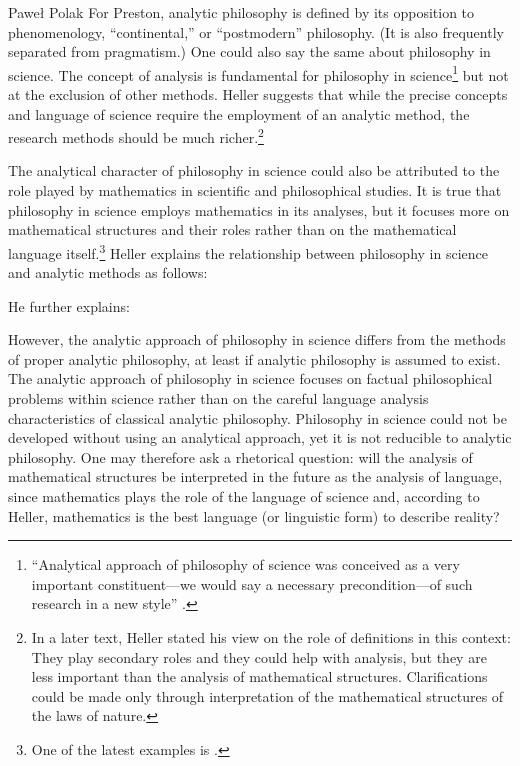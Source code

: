 \begin{artengenv}{Paweł Polak}
For Preston, analytic philosophy is defined by its opposition to phenomenology, ``continental,'' or ``postmodern''
philosophy. (It is also frequently separated from pragmatism.) One could also say the same about philosophy in science.
The concept of analysis is fundamental for philosophy in science\footnote{``Analytical approach of philosophy of science
was conceived as a very important constituent—we would say a necessary precondition—of such research in a new style''
\parencite[p.8]{pol_heller_introduction_1983}.
} but not at the exclusion of other methods. Heller suggests that while the
precise concepts and language of science require the employment of an analytic method, the research methods should be
much richer.\footnote{In a later text, Heller stated his view on the role of definitions in this context: They play
secondary roles and they could help with analysis, but they are less important than the analysis of mathematical
structures. Clarifications could be made only through interpretation of the mathematical structures of the laws of
nature.}

The analytical character of philosophy in science could also be attributed to the role played by mathematics in
scientific and philosophical studies. It is true that philosophy in science employs mathematics in its analyses, but it
focuses more on mathematical structures and their roles rather than on the mathematical language itself.\footnote{One
of the latest examples is
\parencite{pol_heller_category_2016}.
} Heller explains the relationship between
philosophy in science and analytic methods as follows:

He further explains:



However, the analytic approach of philosophy in science differs from the methods of proper analytic philosophy, at least
if analytic philosophy is assumed to exist. The analytic approach of philosophy in science focuses on factual
philosophical problems within science rather than on the careful language analysis characteristics of classical
analytic philosophy. Philosophy in science could not be developed without using an analytical approach, yet it is not
reducible to analytic philosophy. One may therefore ask a rhetorical question: will the analysis of
mathematical structures be interpreted in the future as the analysis of language, since mathematics plays the role of the language
of science and, according to Heller, mathematics is the best language (or linguistic form) to describe reality?


\end{artengenv}
